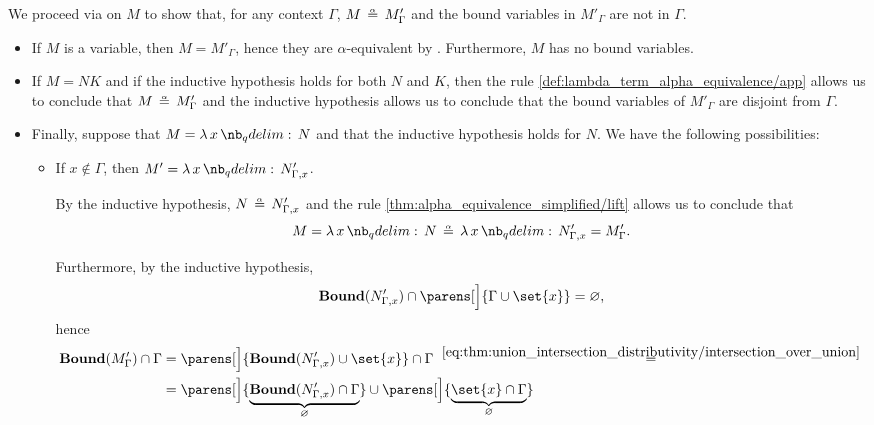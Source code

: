 \begin{defproof}
  We proceed via  on \( M \) to show that, for any context \( \Gamma \), \( M \aequiv M'_\Gamma \) and the bound variables in \( M'_\Gamma \) are not in \( \Gamma \).

  \begin{itemize}
    \item If \( M \) is a variable, then \( M = M'_\Gamma \), hence they are \( \alpha \)-equivalent by . Furthermore, \( M \) has no bound variables.

    \item If \( M = NK \) and if the inductive hypothesis holds for both \( N \) and \( K \), then the rule \ref{def:lambda_term_alpha_equivalence/app} allows us to conclude that \( M \aequiv M'_\Gamma \) and the inductive hypothesis allows us to conclude that the bound variables of \( M'_\Gamma \) are disjoint from \( \Gamma \).

    \item Finally, suppose that \( M = \qabs x N \) and that the inductive hypothesis holds for \( N \). We have the following possibilities:
    \begin{itemize}
      \item If \( x \not\in \Gamma \), then \( M' = \qabs x N'_{\Gamma,x} \).

      By the inductive hypothesis, \( N \aequiv N'_{\Gamma,x} \) and the rule \ref{thm:alpha_equivalence_simplified/lift} allows us to conclude that
      \begin{equation*}
        M = \qabs x N \aequiv \qabs x N'_{\Gamma,x} = M'_\Gamma.
      \end{equation*}

      Furthermore, by the inductive hypothesis,
      \begin{equation*}
        \op*{Bound}(N'_{\Gamma,x}) \cap \parens[\Big]{ \Gamma \cup \set{ x } } = \varnothing,
      \end{equation*}
      hence
      \begin{align*}
        \op*{Bound}(M'_\Gamma) \cap \Gamma
        &=
        \parens[\Big]{ \op*{Bound}(N'_{\Gamma,x}) \cup \set{ x } } \cap \Gamma
        \reloset {\eqref{eq:thm:union_intersection_distributivity/intersection_over_union}} = \\ &=
        \parens[\Big]{ \underbrace{\op*{Bound}(N'_{\Gamma,x}) \cap \Gamma }_\varnothing } \cup \parens[\Big]{ \underbrace{\set{ x } \cap \Gamma}_\varnothing }
      \end{align*}


\end{itemize}
\end{itemize}
\end{defproof}
